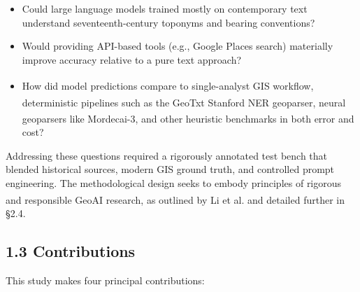 \documentclass[
  10pt,
  twocolumn]{article}
\providecommand{\tightlist}{%
  \setlength{\itemsep}{0pt}\setlength{\parskip}{0pt}}
\begin{document}
\begin{itemize}
\tightlist
\item
  Could large language models trained mostly on contemporary text
  understand seventeenth-century toponyms and bearing conventions?
\item
  Would providing API-based tools (e.g., Google Places search)
  materially improve accuracy relative to a pure text approach?
\item
  How did model predictions compare to single-analyst GIS
  workflow\textsuperscript{},
  deterministic pipelines such as the GeoTxt Stanford NER
  geoparser\textsuperscript{},
  neural geoparsers like
  Mordecai-3\textsuperscript{},
  and other heuristic benchmarks in both error and cost?
\end{itemize}

Addressing these questions required a rigorously annotated test bench
that blended historical sources, modern GIS ground truth, and controlled
prompt engineering. The methodological design seeks to embody principles
of rigorous and responsible GeoAI research, as outlined by Li et
al.\textsuperscript{} and detailed further
in §2.4.

\subsection{1.3 Contributions}\label{contributions}

This study makes four principal contributions:
\end{document}
